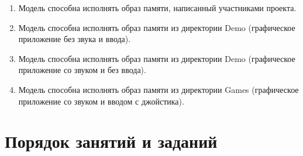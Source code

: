 \begin{enumerate}
    \item Модель способна исполнять образ памяти, написанный участниками проекта.
    \item Модель способна исполнять образ памяти из директории Demo (графическое приложение без звука и ввода).
    \item Модель способна исполнять образ памяти из директории Demo (графическое приложение со звуком и без ввода).
    \item Модель способна исполнять образ памяти из директории Games (графическое приложение со звуком и вводом с джойстика).
\end{enumerate}

% 
% 
% 
% 

\section{Порядок занятий и заданий}

